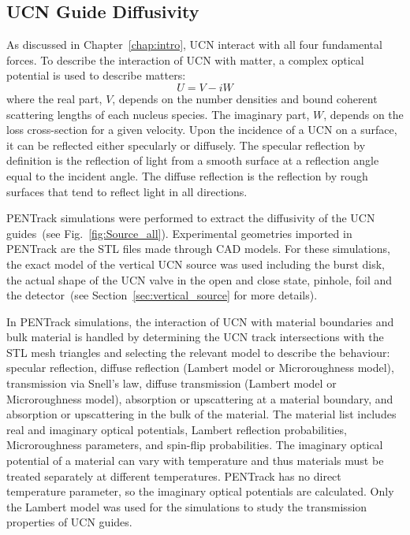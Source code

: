 \subsection{UCN Guide Diffusivity\label{sec:diffusivity}}
As discussed in Chapter~\ref{chap:intro}, UCN interact with all four
fundamental forces. To describe the interaction of UCN with matter, a
complex optical potential is used to describe matters:
\begin{equation}
  \label{eqn:fermipotential}
  U = V - iW
\end{equation}
where the real part, $V$, depends on the number densities and bound
coherent scattering lengths of each nucleus species. The imaginary
part, $W$, depends on the loss cross-section for a given velocity.
Upon the incidence of a UCN on a surface, it can be reflected either
specularly or diffusely. The specular reflection by definition is the
reflection of light from a smooth surface at a reflection angle equal
to the incident angle. The diffuse reflection is the reflection by
rough surfaces that tend to reflect light in all directions.

PENTrack simulations were performed to extract the diffusivity of the
UCN guides~(see Fig.~\ref{fig:Source_all}). Experimental geometries
imported in PENTrack are the STL files made through CAD models. For
these simulations, the exact model of the vertical UCN source was used
including the burst disk, the actual shape of the UCN valve in the
open and close state, pinhole, foil and the detector~(see
Section~\ref{sec:vertical_source} for more details).



In PENTrack simulations, the interaction of UCN with material
boundaries and bulk material is handled by determining the UCN track
intersections with the STL mesh triangles and selecting the relevant
model to describe the behaviour: specular reflection, diffuse
reflection (Lambert model or Microroughness model), transmission via
Snell's law, diffuse transmission (Lambert model or Microroughness
model), absorption or upscattering at a material boundary, and
absorption or upscattering in the bulk of the material. The material
list includes real and imaginary optical potentials, Lambert
reflection probabilities, Microroughness parameters, and spin-flip
probabilities. The imaginary optical potential of a material can vary
with temperature and thus materials must be treated separately at
different temperatures. PENTrack has no direct temperature parameter,
so the imaginary optical potentials are calculated. Only the Lambert
model was used for the simulations to study the transmission
properties of UCN guides.


